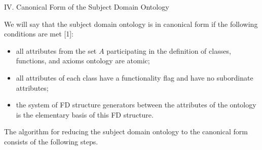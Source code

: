 \documentclass{scndocument}
\begin{document}
\setcounter{page}{240}
\twocolumn

\begin{center}
{IV. Canonical Form of the Subject Domain Ontology}
\end{center}

{We will say that the subject domain ontology is in canonical form if the following conditions are met [1]:} 

\begin{itemize}[noitemsep]
    \item all attributes from the set $A$ participating in the definition of classes, functions, and axioms ontology are atomic;
    \item all attributes of each class have a functionality flag and have no subordinate attributes;
    \item the system of FD structure generators between the attributes of the ontology is the elementary basis of this FD structure.
\end{itemize}

{The algorithm for reducing the subject domain ontology to the canonical form consists of the following steps.}
\end{document}
